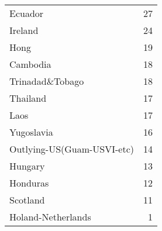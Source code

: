 \begin{tabular}{lr}
 Ecuador                    &              27 \\
 Ireland                    &              24 \\
 Hong                       &              19 \\
 Cambodia                   &              18 \\
 Trinadad\&Tobago            &              18 \\
 Thailand                   &              17 \\
 Laos                       &              17 \\
 Yugoslavia                 &              16 \\
 Outlying-US(Guam-USVI-etc) &              14 \\
 Hungary                    &              13 \\
 Honduras                   &              12 \\
 Scotland                   &              11 \\
 Holand-Netherlands         &               1 \\
\bottomrule
\end{tabular}
